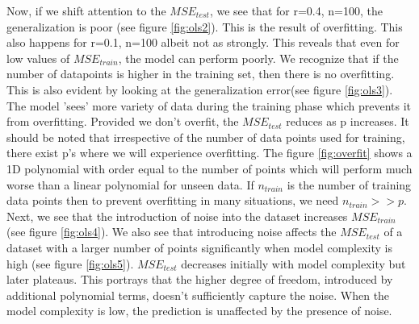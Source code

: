 Now, if we shift attention to the $MSE_{test}$, we see that for r=0.4, n=100, the generalization is poor (see figure \ref{fig:ols2}). This is the result of overfitting. This also happens for r=0.1, n=100 albeit not as strongly. This reveals that even for low values of $MSE_{train}$, the model can perform poorly. We recognize that if the number of datapoints is higher in the training set, then there is no overfitting. This is also evident by looking at the generalization error(see figure \ref{fig:ols3}). The model 'sees' more variety of data during the training phase which prevents it from overfitting. Provided we don't overfit, the $MSE_{test}$ reduces as p  increases. It should be noted that irrespective of the number of data points used for training, there exist p's where we will experience overfitting. The figure \ref{fig:overfit} shows a 1D polynomial with order equal to the number of points which will perform much worse than a linear polynomial for unseen data. If $n_{train}$ is the number of training data points then to prevent overfitting in many situations, we need $n_{train} >> p$. 
\newline
\newline
Next, we see that the introduction of noise into the dataset increases $MSE_{train}$ (see figure \ref{fig:ols4}). We also see that introducing noise affects the $MSE_{test}$ of a dataset with a larger number of points significantly when model complexity is high (see figure \ref{fig:ols5}). $MSE_{test}$ decreases initially with model complexity but later plateaus. This portrays that the higher degree of freedom, introduced by additional polynomial terms, doesn't sufficiently capture the noise. When the model complexity is low, the prediction is unaffected by the presence of noise. 
\newline\newline
